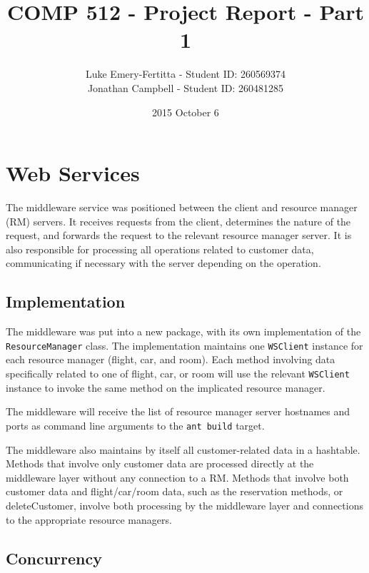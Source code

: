 \documentclass[11pt]{article}
\begin{document}
\title{COMP 512 - Project Report - Part 1}
\author{Luke Emery-Fertitta - Student ID: 260569374 \\ Jonathan Campbell - Student ID: 260481285}
\date{2015 October 6}
\maketitle

\section*{Web Services}

The middleware service was positioned between the client and resource manager (RM) servers. It receives requests from the client, determines the nature of the request, and forwards the request to the relevant resource manager server. It is also responsible for processing all operations related to customer data, communicating if necessary with the server depending on the operation. \par

\subsection*{Implementation} 

The middleware was put into a new package, with its own implementation of the \texttt{ResourceManager} class. The implementation maintains one \texttt{WSClient} instance for each resource manager (flight, car, and room). Each method involving data specifically related to one of flight, car, or room will use the relevant \texttt{WSClient} instance to invoke the same method on the implicated resource manager. \par

The middleware will receive the list of resource manager server hostnames and ports as command line arguments to the \texttt{ant build} target. \par

The middleware also maintains by itself all customer-related data in a hashtable. Methods that involve only customer data are processed directly at the middleware layer without any connection to a RM. Methods that involve both customer data and flight/car/room data, such as the reservation methods, or deleteCustomer, involve both processing by the middleware layer and connections to the appropriate resource managers. \par

\subsection*{Concurrency} 
\end{document}
